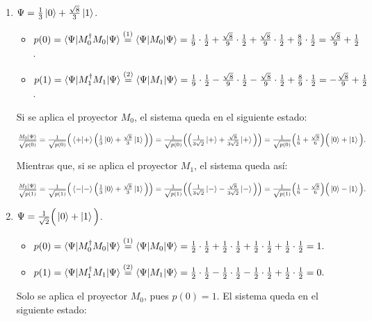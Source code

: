 \documentclass[a4paper,11pt]{article}
\begin{document}
\begin{enumerate}[label=\alph*)]
\item $\Psi = \frac{1}{3}\left\vert{0}\right\rangle + \frac{\sqrt{8}}{3}\left\vert{1}\right\rangle$. 

  \begin{itemize}
  \item $p(0) = \braket{\Psi | M_0^{\dag} M_0 | \Psi} \stackrel{(1)}{=} 
    \braket{\Psi | M_0 | \Psi} = \frac{1}{9}\cdot\frac{1}{2} + \frac{\sqrt{8}}{9}\cdot\frac{1}{2} + \frac{\sqrt{8}}{9}\cdot\frac{1}{2}
    + \frac{8}{9}\cdot\frac{1}{2} = \frac{\sqrt{8}}{9} + \frac{1}{2}$.
  \item $p(1) = \braket{\Psi | M_1^{\dag} M_1 | \Psi} \stackrel{(2)}{=} 
    \braket{\Psi | M_1 | \Psi} = \frac{1}{9}\cdot\frac{1}{2} - \frac{\sqrt{8}}{9}\cdot\frac{1}{2} - \frac{\sqrt{8}}{9}\cdot\frac{1}{2}
    + \frac{8}{9}\cdot\frac{1}{2} = - \frac{\sqrt{8}}{9} + \frac{1}{2}$.
  \end{itemize}

Si se aplica el proyector $M_0$, el sistema queda en el siguiente estado:

$\frac{M_0 \left\vert{\Psi}\right\rangle}{\sqrt{p(0)}} = \frac{1}{\sqrt{p(0)}} \Big( \braket{+|+}\Big( \frac{1}{3}\left\vert{0}\right\rangle + \frac{\sqrt{8}}{3}\left\vert{1}\right\rangle \Big) \Big) =
\frac{1}{\sqrt{p(0)}} \Big( \Big( \frac{1}{3\sqrt{2}}\left\vert{+}\right\rangle + \frac{\sqrt{8}}{3\sqrt{2}}\left\vert{+}\right\rangle \Big) \Big) =
\frac{1}{\sqrt{p(0)}} \Big( \frac{1}{6} + \frac{\sqrt{8}}{6} \Big) \Big( \left\vert{0}\right\rangle + \left\vert{1}\right\rangle \Big).$

Mientras que, si se aplica el proyector $M_1$, el sistema queda así:

$\frac{M_1 \left\vert{\Psi}\right\rangle}{\sqrt{p(1)}} = \frac{1}{\sqrt{p(1)}} \Big( \braket{-|-}\Big( \frac{1}{3}\left\vert{0}\right\rangle + \frac{\sqrt{8}}{3}\left\vert{1}\right\rangle \Big) \Big) =
\frac{1}{\sqrt{p(1)}} \Big( \Big( \frac{1}{3\sqrt{2}}\left\vert{-}\right\rangle - \frac{\sqrt{8}}{3\sqrt{2}}\left\vert{-}\right\rangle \Big) \Big) =
\frac{1}{\sqrt{p(1)}} \Big( \frac{1}{6} - \frac{\sqrt{8}}{6} \Big) \Big( \left\vert{0}\right\rangle - \left\vert{1}\right\rangle \Big).$

\item $\Psi = \frac{1}{\sqrt{2}} \Big( \left\vert{0}\right\rangle + \left\vert{1}\right\rangle \Big)$. 

  \begin{itemize}
  \item $p(0) = \braket{\Psi | M_0^{\dag} M_0 | \Psi} \stackrel{(1)}{=} 
    \braket{\Psi | M_0 | \Psi} = \frac{1}{2}\cdot\frac{1}{2} + \frac{1}{2}\cdot\frac{1}{2} + \frac{1}{2}\cdot\frac{1}{2} +
    \frac{1}{2}\cdot\frac{1}{2} = 1.$
  \item $p(1) = \braket{\Psi | M_1^{\dag} M_1 | \Psi} \stackrel{(2)}{=} 
    \braket{\Psi | M_1 | \Psi} = \frac{1}{2}\cdot\frac{1}{2} - \frac{1}{2}\cdot\frac{1}{2} - \frac{1}{2}\cdot\frac{1}{2} +
    \frac{1}{2}\cdot\frac{1}{2} = 0.$
  \end{itemize}
  Solo se aplica el proyector $M_0$, pues $p(0) = 1$. El sistema queda en el siguiente estado:


\end{enumerate}
\end{document}
